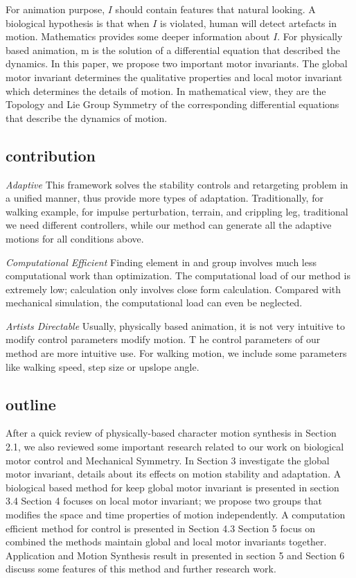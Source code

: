 For animation purpose, $I$ should contain features that natural looking. 
A biological hypothesis is that when $I$ is violated, human will detect artefacts in motion. 
Mathematics provides some deeper information about $I$.
 For physically based animation, m is the solution of a differential equation that described the dynamics. 
In this paper, we propose two important motor invariants. 
The global motor invariant determines the qualitative properties and local motor invariant which determines the details of motion. 
In mathematical view, they are the Topology and Lie Group Symmetry of the corresponding differential equations that describe the dynamics of motion.

\subsection*{contribution}

\textit{Adaptive}
This framework solves the stability controls and retargeting problem in a unified manner, thus provide more types of adaptation. 
Traditionally, for walking example, for impulse perturbation, terrain, and crippling leg, traditional we need different controllers, while our method can generate all the adaptive motions for all conditions above.

\textit{Computational Efficient}
Finding element in and group involves much less computational work than optimization.
The computational load of our method is extremely low; calculation only involves close form calculation. 
Compared with mechanical simulation, the computational load can even be neglected.

\textit{Artists Directable}
Usually, physically based animation, it is not very intuitive to modify control parameters modify motion. T
he control parameters of our method are more intuitive use. For walking motion, we include some parameters like walking speed, step size or upslope angle.

\subsection*{outline}
After a quick review of physically-based character motion synthesis in Section 2.1,  we also reviewed some important research related to our work on biological motor control and Mechanical Symmetry.
In Section 3 investigate the global motor invariant, details about its effects on motion stability and adaptation. A biological based method for keep global motor invariant is presented in section 3.4
Section 4 focuses on local motor invariant; we propose two groups that modifies the space and time properties of motion independently. A computation efficient method for control is presented in Section 4.3
Section 5 focus on combined the methods maintain global and local motor invariants together.
Application and Motion Synthesis result in presented in section 5 and Section 6 discuss some features of this method and further research work.

